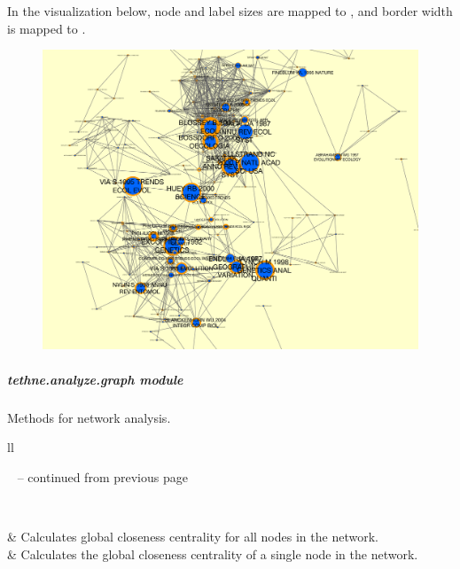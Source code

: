 \documentclass[letterpaper,10pt,english]{sphinxmanual}
\begin{document}
\begin{fulllineitems}
In the visualization below, node and label sizes are mapped to ,
and border width is mapped to .
\begin{figure}[htbp]
\centering

\includegraphics{cocitation_sigma2.png}
\end{figure}

\end{fulllineitems}



\subparagraph{tethne.analyze.graph module}
\label{tethne.analyze.graph:module-tethne.analyze.graph}\label{tethne.analyze.graph:tethne-analyze-graph-module}\label{tethne.analyze.graph::doc}
Methods for network analysis.

\begin{longtable}{ll}
\hline
\endfirsthead

%
{{\textsf{\tablename\ \thetable{} -- continued from previous page}}} \\
\hline
\endhead

\hline {} \\ \hline
\endfoot

\endlastfoot


{\hyperref[tethne.analyze.graph:tethne.analyze.graph.global_closeness_centrality]{}}
 & 
Calculates global closeness centrality for all nodes in the network.
\\

{\hyperref[tethne.analyze.graph:tethne.analyze.graph.node_global_closeness_centrality]{}}
 & 
Calculates the global closeness centrality of a single node in the network.
\\
\hline\end{longtable}
\end{document}
